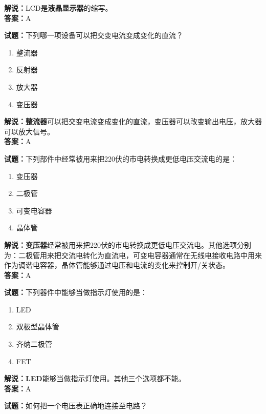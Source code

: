 \documentclass{ctexbook}
\begin{document}
\noindent\textbf{解说：}LCD是\textbf{液晶显示器}的缩写。\\\noindent\textbf{答案：}A

\bigskip


\noindent\textbf{试题：}下列哪一项设备可以把交变电流变成变化的直流？

\begin{enumerate}[leftmargin=3em]
	\item 整流器
	\item 反射器
	\item 放大器
	\item 变压器
\end{enumerate}

\noindent\textbf{解说：整流器}可以把交变电流变成变化的直流，变压器可以改变输出电压，放大器可以放大信号。\\\noindent\textbf{答案：}A


\bigskip


\noindent\textbf{试题：}下列部件中经常被用来把220伏的市电转换成更低电压交流电的是：

\begin{enumerate}[leftmargin=3em]
	\item 变压器
	\item 二极管
	\item 可变电容器
	\item 晶体管
\end{enumerate}

\noindent\textbf{解说：变压器}经常被用来把220伏的市电转换成更低电压交流电。其他选项分别为：二极管用来把交流电转化为直流电，可变电容器通常在无线电接收电路中用来作为调谐电容器，晶体管能够通过电压和电流的变化来控制开/关状态。\\\noindent\textbf{答案：}A

\bigskip


\noindent\textbf{试题：}下列器件中能够当做指示灯使用的是：

\begin{enumerate}[leftmargin=3em]
	\item LED
	\item 双极型晶体管
	\item 齐纳二极管
	\item FET
\end{enumerate}

\noindent\textbf{解说：LED}能够当做指示灯使用。其他三个选项都不能。\\\noindent\textbf{答案：}A

\bigskip


\noindent\textbf{试题：}如何把一个电压表正确地连接至电路？
\end{document}
